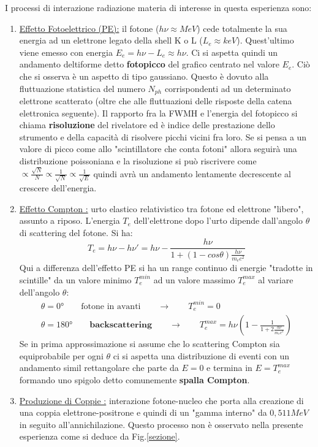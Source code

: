 \documentclass[12pt,a4paper,openright,twoside]{article}
\numberwithin{equation}{section} %
\begin{document}
\begin{enumerate}
 I processi di interazione radiazione materia di interesse in questa esperienza sono:
\begin{enumerate}
\item \underline{Effetto Fotoelettrico (PE):} il fotone ($h \nu \approx MeV$) cede totalmente la sua energia ad un elettrone legato della shell K o L  ($L_e \approx keV$). Quest'ultimo viene emesso con energia $E_e=h \nu - L_e \approx h \nu$. Ci si aspetta quindi un andamento deltiforme detto \textbf{fotopicco} del grafico centrato nel valore $E_e$. Ciò che si osserva è un aspetto di tipo gaussiano. Questo è dovuto alla fluttuazione statistica del numero $N_{ph}$ corrispondenti ad un determinato elettrone scatterato (oltre che alle fluttuazioni delle risposte della catena elettronica seguente). Il rapporto fra la FWMH e l'energia del fotopicco si chiama \textbf{risoluzione} del rivelatore ed è indice delle prestazione dello strumento e della capacità di risolvere picchi vicini fra loro. Se si pensa a un valore di picco come allo "scintillatore che conta fotoni" allora seguirà una distribuzione poissoniana e la risoluzione si può riscrivere come $\propto \frac{\sqrt{N}}{N} \propto \frac{1}{\sqrt{N}} \propto \frac{1}{\sqrt{E}} $ quindi avrà un andamento lentamente decrescente al crescere dell'energia.

\item \label{Compt} \underline{Effetto Compton :} urto elastico relativistico tra fotone ed elettrone "libero", assunto a riposo. L'energia $T_e$ dell'elettrone dopo l'urto dipende dall'angolo $\theta$ di scattering del fotone. Si ha:
\begin{equation}\label{back}
T_e=h \nu - h \nu ' = h \nu - \frac{h \nu }{1+(1-cos \theta )\frac{h \nu}{m_e c^2}}
\end{equation}
Qui a differenza dell'effetto PE si ha un range continuo di energie "tradotte in scintille" da un valore minimo $T_{e} ^{min}$ ad un valore massimo  $T_{e} ^{max}$ al variare dell'angolo $\theta $:
\begin{gather}
\theta=0° \qquad \text{fotone in avanti}\qquad \rightarrow \qquad T_{e} ^{min}=0\\
\theta=180° \qquad \textbf{backscattering} \qquad \rightarrow \qquad T_{e} ^{max}=h \nu \left(1- \frac{1}{1+2 \frac{h \nu}{m_e c^2}} \right) 
\label{Te}
\end{gather}
Se in prima approssimazione si assume che lo scattering Compton sia equiprobabile per ogni $\theta$ ci si aspetta una distribuzione di eventi con un andamento simil rettangolare che parte da $E=0$ e termina in $E=T_{e} ^{max}$ formando uno spigolo detto comunemente \textbf{spalla Compton}.
\item \underline{Produzione di Coppie :} interazione fotone-nucleo che porta alla creazione di una coppia elettrone-positrone e quindi di un "gamma interno" da $0,511 MeV$ in seguito all'annichilazione. Questo processo non è osservato nella presente esperienza come si deduce da Fig.\ref{sezione}.


\end{enumerate}
\end{enumerate}
\end{document}
